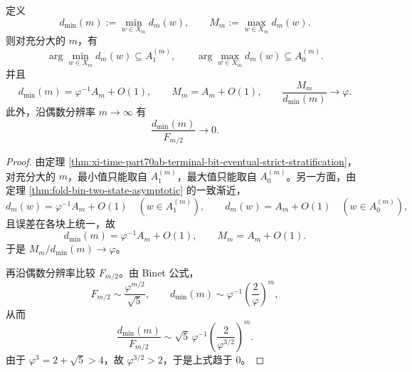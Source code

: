 \begin{corollary}[极值纤维的末位定位与最小尺度失配率]\label{cor:xi-time-part70ab-extremal-fibers-terminal-bit-localization}
定义
\[
d_{\min}(m):=\min_{w\in X_m}d_m(w),
\qquad
M_m:=\max_{w\in X_m}d_m(w).
\]
则对充分大的 \(m\)，有
\[
\arg\min_{w\in X_m} d_m(w)\subseteq A_1^{(m)},
\qquad
\arg\max_{w\in X_m} d_m(w)\subseteq A_0^{(m)}.
\]
并且
\[
d_{\min}(m)=\varphi^{-1}A_m+O(1),
\qquad
M_m=A_m+O(1),
\qquad
\frac{M_m}{d_{\min}(m)}\longrightarrow \varphi.
\]
此外，沿偶数分辨率 \(m\to\infty\) 有
\[
\frac{d_{\min}(m)}{F_{m/2}}\longrightarrow 0.
\]
\end{corollary}
\begin{proof}
由定理 \ref{thm:xi-time-part70ab-terminal-bit-eventual-strict-stratification}，对充分大的 \(m\)，最小值只能取自 \(A_1^{(m)}\)，最大值只能取自 \(A_0^{(m)}\)。另一方面，由定理 \ref{thm:fold-bin-two-state-asymptotic} 的一致渐近，
\[
d_m(w)=\varphi^{-1}A_m+O(1)\quad(w\in A_1^{(m)}),
\qquad
d_m(w)=A_m+O(1)\quad(w\in A_0^{(m)}),
\]
且误差在各块上统一，故
\[
d_{\min}(m)=\varphi^{-1}A_m+O(1),
\qquad
M_m=A_m+O(1).
\]
于是 \(M_m/d_{\min}(m)\to \varphi\)。

再沿偶数分辨率比较 \(F_{m/2}\)。由 Binet 公式，
\[
F_{m/2}\sim \frac{\varphi^{m/2}}{\sqrt5},
\qquad
d_{\min}(m)\sim \varphi^{-1}\left(\frac{2}{\varphi}\right)^m,
\]
从而
\[
\frac{d_{\min}(m)}{F_{m/2}}
\sim
\sqrt5\,\varphi^{-1}
\left(\frac{2}{\varphi^{3/2}}\right)^m.
\]
由于 \(\varphi^3=2+\sqrt5>4\)，故 \(\varphi^{3/2}>2\)，于是上式趋于 \(0\)。
\end{proof}

